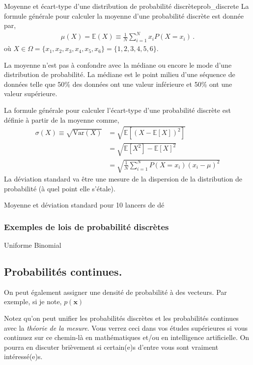 \documentclass[titlepage]{article}
\theoremstyle{cleanremark}
\begin{document}
\begin{definition}{Moyenne et écart-type d'une distribution de probabilité discrète}{prob_discrete}
    La formule générale pour calculer la moyenne d'une probabilité discrète est donnée par,
    \begin{align}
        \mu(X)=\mathbb{E}(X) \equiv \frac{1}{N}\sum_{i=1}^{N}x_iP(X=x_i) \, .
    \end{align}
    où $X\in \Omega =\{x_1, x_2,x_3,x_4,x_5, x_6 \}= \{1,2,3,4,5,6\}$.
    
    La moyenne n'est pas à confondre avec la médiane ou encore le mode d'une distribution de probabilité. La médiane est le point milieu d'une séquence de données telle que 50\% des données ont une valeur inférieure et 50\% ont une valeur supérieure. 

    La formule générale pour calculer l'écart-type d'une probabilité discrète est définie à partir de la moyenne comme, 
    \begin{align}
        \sigma(X) \equiv \sqrt{\text{Var}(X)}&=\sqrt{\mathbb{E}[(X-\mathbb{E}[X])^2]}
        \\
        &=\sqrt{\mathbb{E}[X^2]-\mathbb{E}[X]^2}
        \\
        &=\sqrt{\frac{1}{N}\sum_{i=1}^{N}P(X=x_i)(x_i-\mu)^2}
    \end{align}
    La déviation standard va être une mesure de la dispersion de la distribution de probabilité (à quel point elle s'étale).
\end{definition}


\begin{example}{Moyenne et déviation standard pour 10 lancers de dé}{}
    
\end{example}




\subsubsection{Exemples de lois de probabilité discrètes}
Uniforme
Binomial


\subsection{Probabilités continues.}
On peut également assigner une densité de probabilité à des vecteurs. Par exemple, si je note, 
$p(\mathbf{x})$


Notez qu'on peut unifier les probabilités discrètes et les probabilités continues avec la \textit{théorie de la mesure}. Vous verrez ceci dans vos études supérieures si vous continuez sur ce chemin-là en mathématiques et/ou en intelligence artificielle. On pourra en discuter brièvement si certain(e)s d'entre vous sont vraiment intéressé(e)s.    
\end{document}
